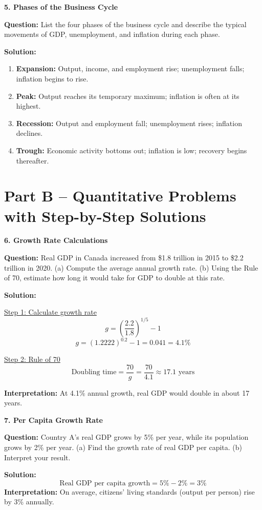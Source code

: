 \documentclass[12pt]{article}
\begin{document}
\textbf{5. Phases of the Business Cycle}

\textbf{Question:}  
List the four phases of the business cycle and describe the typical movements of GDP, unemployment, and inflation during each phase.

\textbf{Solution:}  
\begin{enumerate}
    \item \textbf{Expansion:} Output, income, and employment rise; unemployment falls; inflation begins to rise.
    \item \textbf{Peak:} Output reaches its temporary maximum; inflation is often at its highest.
    \item \textbf{Recession:} Output and employment fall; unemployment rises; inflation declines.
    \item \textbf{Trough:} Economic activity bottoms out; inflation is low; recovery begins thereafter.
\end{enumerate}


\newpage
\section*{Part B – Quantitative Problems with Step-by-Step Solutions}

\textbf{6. Growth Rate Calculations}

\textbf{Question:}  
Real GDP in Canada increased from \$1.8 trillion in 2015 to \$2.2 trillion in 2020.  
(a) Compute the average annual growth rate.  
(b) Using the Rule of 70, estimate how long it would take for GDP to double at this rate.

\textbf{Solution:}

\underline{Step 1: Calculate growth rate}
\[
g = \left(\frac{2.2}{1.8}\right)^{1/5} - 1
\]
\[
g = (1.2222)^{0.2} - 1 = 0.041 = 4.1\%
\]

\underline{Step 2: Rule of 70}
\[
\text{Doubling time} = \frac{70}{g} = \frac{70}{4.1} \approx 17.1 \text{ years}
\]

\textbf{Interpretation:}  
At 4.1\% annual growth, real GDP would double in about 17 years.



\textbf{7. Per Capita Growth Rate}

\textbf{Question:}  
Country A’s real GDP grows by 5\% per year, while its population grows by 2\% per year.  
(a) Find the growth rate of real GDP per capita.  
(b) Interpret your result.

\textbf{Solution:}
\[
\text{Real GDP per capita growth} = 5\% - 2\% = 3\%
\]
\textbf{Interpretation:}  
On average, citizens’ living standards (output per person) rise by 3\% annually.
\end{document}
